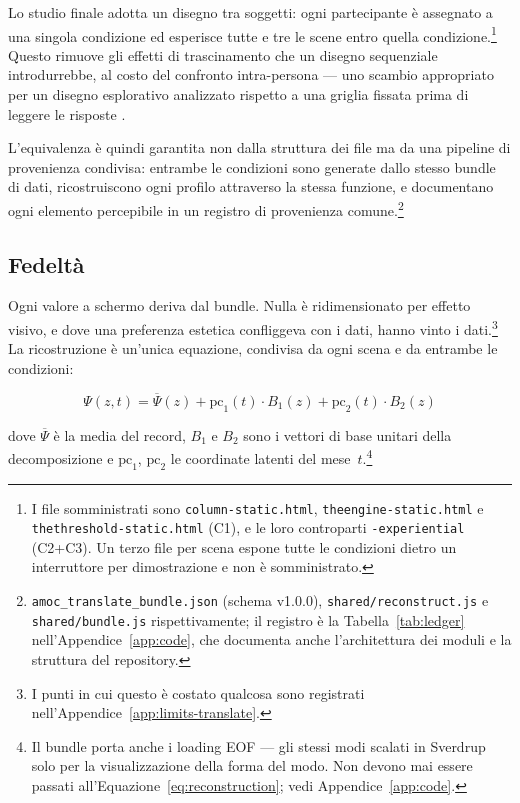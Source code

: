 Lo studio finale adotta un disegno tra soggetti: ogni partecipante è assegnato a una singola condizione ed esperisce tutte e tre le scene entro quella condizione.\footnote{I file somministrati sono \texttt{column-static.html}, \texttt{theengine-static.html} e \texttt{thethreshold-static.html} (C1), e le loro controparti \texttt{-experiential} (C2+C3). Un terzo file per scena espone tutte le condizioni dietro un interruttore per dimostrazione e non è somministrato.} Questo rimuove gli effetti di trascinamento che un disegno sequenziale introdurrebbe, al costo del confronto intra-persona --- uno scambio appropriato per un disegno esplorativo analizzato rispetto a una griglia fissata prima di leggere le risposte \parencite{braunclarke2019}.

L'equivalenza è quindi garantita non dalla struttura dei file ma da una pipeline di provenienza condivisa: entrambe le condizioni sono generate dallo stesso bundle di dati, ricostruiscono ogni profilo attraverso la stessa funzione, e documentano ogni elemento percepibile in un registro di provenienza comune.\footnote{\texttt{amoc\_translate\_bundle.json} (schema v1.0.0), \texttt{shared/reconstruct.js} e \texttt{shared/bundle.js} rispettivamente; il registro è la Tabella~\ref{tab:ledger} nell'Appendice~\ref{app:code}, che documenta anche l'architettura dei moduli e la struttura del repository.}

\subsection{Fedeltà}
\label{subsec:fidelity}

Ogni valore a schermo deriva dal bundle. Nulla è ridimensionato per effetto visivo, e dove una preferenza estetica confliggeva con i dati, hanno vinto i dati.\footnote{I punti in cui questo è costato qualcosa sono registrati nell'Appendice~\ref{app:limits-translate}.} La ricostruzione è un'unica equazione, condivisa da ogni scena e da entrambe le condizioni:

\begin{equation}
\label{eq:reconstruction}
\Psi(z, t) = \overline{\Psi}(z) + \mathrm{pc}_1(t) \cdot B_1(z) + \mathrm{pc}_2(t) \cdot B_2(z)
\end{equation}

dove $\overline{\Psi}$ è la media del record, $B_1$ e $B_2$ sono i vettori di base unitari della decomposizione e $\mathrm{pc}_1$, $\mathrm{pc}_2$ le coordinate latenti del mese~$t$.\footnote{Il bundle porta anche i loading EOF --- gli stessi modi scalati in Sverdrup solo per la visualizzazione della forma del modo. Non devono mai essere passati all'Equazione~\ref{eq:reconstruction}; vedi Appendice~\ref{app:code}.}

